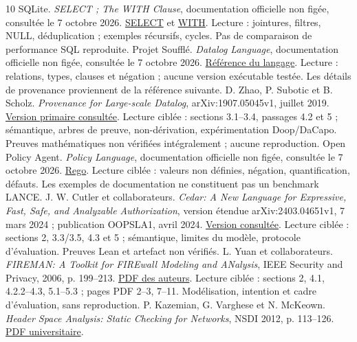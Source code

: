 \documentclass[11pt,a4paper]{article}
\begin{document}
{}
\begin{thebibliography}{10}
\small
{} SQLite. \emph{SELECT ; The WITH Clause}, documentation officielle
non figée, consultée le 7 octobre 2026.
\href{https://www.sqlite.org/lang_select.html}{SELECT} et
\href{https://www.sqlite.org/lang_with.html}{WITH}.
Lecture : jointures, filtres, NULL, déduplication ; exemples récursifs, cycles.
Pas de comparaison de performance SQL reproduite.
 Projet Soufflé. \emph{Datalog Language}, documentation
officielle non figée, consultée le 7 octobre 2026.
\href{https://souffle-lang.org/datalog-language}{Référence du langage}.
Lecture : relations, types, clauses et négation ; aucune version exécutable
testée. Les détails de provenance proviennent de la référence suivante.
 D. Zhao, P. Subotic et B. Scholz. \emph{Provenance for
Large-scale Datalog}, arXiv:1907.05045v1, juillet 2019.
\href{https://arxiv.org/html/1907.05045v1}{Version primaire consultée}.
Lecture ciblée : sections 3.1--3.4, passages 4.2 et 5 ; sémantique, arbres de preuve,
non-dérivation, expérimentation Doop/DaCapo. Preuves mathématiques non vérifiées
intégralement ; aucune reproduction.
 Open Policy Agent. \emph{Policy Language}, documentation
officielle non figée, consultée le 7 octobre 2026.
\href{https://www.openpolicyagent.org/docs/policy-language}{Rego}.
Lecture ciblée : valeurs non définies, négation, quantification, défauts.
Les exemples de documentation ne constituent pas un benchmark LANCE.
 J. W. Cutler et collaborateurs. \emph{Cedar: A New Language
for Expressive, Fast, Safe, and Analyzable Authorization}, version étendue
arXiv:2403.04651v1, 7 mars 2024 ; publication OOPSLA1, avril 2024.
\href{https://arxiv.org/html/2403.04651v1}{Version consultée}.
Lecture ciblée : sections 2, 3.3/3.5, 4.3 et 5 ; sémantique, limites du modèle,
protocole d'évaluation. Preuves Lean et artefact non vérifiés.
 L. Yuan et collaborateurs. \emph{FIREMAN: A Toolkit for
FIREwall Modeling and ANalysis}, IEEE Security and Privacy, 2006, p. 199--213.
\href{https://haochen.org/publications/yuan2006fireman.pdf}{PDF des auteurs}.
Lecture ciblée : sections 2, 4.1, 4.2.2--4.3, 5.1--5.3 ; pages PDF 2--3,
7--11. Modélisation, intention et cadre d'évaluation, sans reproduction.
 P. Kazemian, G. Varghese et N. McKeown. \emph{Header Space
Analysis: Static Checking for Networks}, NSDI 2012, p. 113--126.
\href{https://web.stanford.edu/class/cs244/papers/HeaderSpaceAnalysis.pdf}{PDF universitaire}.

\end{thebibliography}
\end{document}
